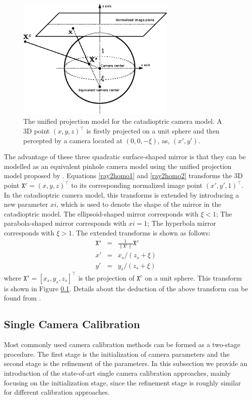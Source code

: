 \documentclass{report}
\begin{document}
\begin{figure}
\centering
\includegraphics[width = 0.7\textwidth]{images/liftSphere.eps}
\caption{The unified projection model for the catadioptric camera model. A 3D point $(x, y, z)^\top$ is firstly projected on a unit sphere and then percepted by a camera located at $(0, 0, -\xi)$, as, $(x', y')$. }
\end{figure}


The advantage of these three quadratic surface-shaped mirror is that they can be modelled as an equivalent pinhole camera model using the unified projection model proposed by \cite{}. Equations \ref{ray2homo1} and \ref{ray2homo2} transforms the 3D point $\mathtt{X}^c = (x, y, z)^\top$ to its corresponding normalized image point $(x', y', 1)^\top$. In the catadioptric camera model, this transforms is extended by introducing a new parameter $xi$, which is used to denote the shape of the mirror in the catadioptric model. The ellipsoid-shaped mirror corresponds with $\xi < 1$; The parabola-shaped mirror corresponds with $xi = 1$; The hyperbola mirror corresponds with $\xi > 1$. The extended transforms is shown as follows: 
\begin{eqnarray}
\mathtt{X}^s &=&
\frac{1}{\| \mathtt{X}^c \|} \mathtt{X}^c \\
x' &=& x_s / (z_s + \xi) \\
y' &=& y_s / (z_s + \xi) 
\end{eqnarray}
where $\mathtt{X}^s = [x_s, y_s, z_s]^\top$ is the projection of $\mathtt{X}^c$ on a unit sphere. This transform is shown in Figure \ref{}. Details about the deduction of the above transform can be found from \cite{}. 


\subsection{Single Camera Calibration}
Most commonly used camera calibration methods can be formed as a two-stage procedure. The first stage is the initialization of camera parameters and the second stage is the refinement of the parameters. In this subsection we provide an introduction of the state-of-art single camera calibration approaches, mainly focusing on the initialization stage, since the refinement stage is roughly similar for different calibration approaches. 
\end{document}
